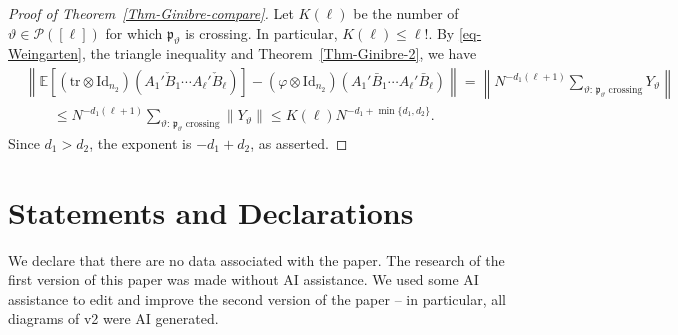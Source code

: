 \documentclass[12pt]{article}
\numberwithin{equation}{section}
\theoremstyle{plain}
\def\bE{\mathbb E}
\def\cP{\mathcal P}
\def\id{\mathrm {Id}}
\def\tr{\mathrm {tr}}
\begin{document}
\begin{proof}[Proof of Theorem~\ref{Thm-Ginibre-compare}]
Let $K(\ell)$ be the number of $\vartheta\in\cP([\ell])$ for which $\mathfrak p_\vartheta$ is crossing. In particular, $K(\ell)\le \ell!$. By \eqref{eq-Weingarten}, the triangle inequality and Theorem~\ref{Thm-Ginibre-2}, we have
\begin{align*}
&\left\|\bE[(\tr\otimes\id_{n_2})(A_1'\check B_1\cdots A_\ell'\check B_\ell)]
-(\varphi\otimes\id_{n_2})(A_1'\bar B_1\cdots A_\ell'\bar B_\ell)\right\|
= \left\| N^{-d_1(\ell+1)}\sum_{\vartheta:\,\mathfrak p_\vartheta\text{ crossing}}Y_\vartheta \right\| \\
&\qquad\le N^{-d_1(\ell+1)}\sum_{\vartheta:\,\mathfrak p_\vartheta\text{ crossing}}\|Y_\vartheta\|
\le K(\ell)N^{-d_1+\min\{d_1,d_2\}}.
\end{align*}
Since $d_1>d_2$, the exponent is $-d_1+d_2$, as asserted.
\end{proof}

\section*{Statements and Declarations}

We declare that there are no data associated with the paper.
The research of the first version of this paper was made without AI assistance. We used some AI assistance to edit and improve the second version of the paper -- in particular, all diagrams of v2 were AI generated. 

\printbibliography
\end{document}
